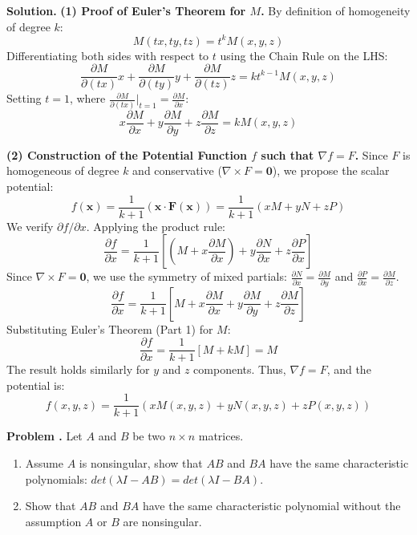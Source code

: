 \documentclass[12pt,a4paper,oneside]{article}
\newcounter{problemname}
\newenvironment{problem}
  {\begin{shaded}\stepcounter{problemname}\par\noindent\textbf{Problem \arabic{problemname}.
}\newline}
  {\end{shaded}\par}
\newenvironment{solution}
  {\par\noindent\textbf{Solution. }\newline}
  {\par}
\begin{document}
\begin{solution}
\textbf{(1) Proof of Euler's Theorem for $M$.}
By definition of homogeneity of degree $k$:
$$M(tx, ty, tz) = t^k M(x, y, z)$$
Differentiating both sides with respect to $t$ using the Chain Rule on the LHS:
$$ \frac{\partial M}{\partial (tx)} x + \frac{\partial M}{\partial (ty)} y + \frac{\partial M}{\partial (tz)} z = k t^{k-1} M(x, y, z) $$Setting $t=1$, where $\frac{\partial M}{\partial (tx)}\Big|_{t=1} = \frac{\partial M}{\partial x}$:$$ x\frac{\partial M}{\partial x}+y\frac{\partial M}{\partial y}+z\frac{\partial M}{\partial z}=kM(x,y,z) $$

\textbf{(2) Construction of the Potential Function $f$ such that $\nabla f = F$.}
Since $F$ is homogeneous of degree $k$ and conservative ($\nabla \times F = \mathbf{0}$), we propose the scalar potential:
$$ f(\mathbf{x}) = \frac{1}{k+1} (\mathbf{x} \cdot \mathbf{F}(\mathbf{x})) = \frac{1}{k+1} (xM + yN + zP) $$We verify $\partial f / \partial x$. Applying the product rule:$$ \frac{\partial f}{\partial x} = \frac{1}{k+1} \left[ \left( M + x \frac{\partial M}{\partial x} \right) + y \frac{\partial N}{\partial x} + z \frac{\partial P}{\partial x} \right] $$
Since $\nabla \times F = \mathbf{0}$, we use the symmetry of mixed partials: $\frac{\partial N}{\partial x} = \frac{\partial M}{\partial y}$ and $\frac{\partial P}{\partial x} = \frac{\partial M}{\partial z}$.
$$ \frac{\partial f}{\partial x} = \frac{1}{k+1} \left[ M + x \frac{\partial M}{\partial x} + y \frac{\partial M}{\partial y} + z \frac{\partial M}{\partial z} \right] $$Substituting Euler's Theorem (Part 1) for $M$:$$ \frac{\partial f}{\partial x} = \frac{1}{k+1} [ M + k M ] = M $$The result holds similarly for $y$ and $z$ components. Thus, $\nabla f = F$, and the potential is:$$f(x,y,z) = \frac{1}{k+1} (xM(x,y,z) + yN(x,y,z) + zP(x,y,z))$$
\end{solution}

\newpage
\begin{problem}
Let $A$ and $B$ be two $n\times n$ matrices.
\begin{enumerate} 
    \item Assume $A$ is nonsingular, show that $AB$ and $BA$ have the same characteristic polynomials:
 $det(\lambda I-AB)=det(\lambda I-BA).$
    \item Show that $AB$ and $BA$ have the same characteristic polynomial without the assumption $A$ or $B$ are nonsingular.
\end{enumerate}
\end{problem}
\end{document}
